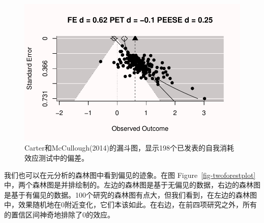 \documentclass[
  letterpaper,
  DIV=11,
  numbers=noendperiod]{scrreprt}
\begin{document}
\begin{figure}

{\centering \includegraphics[width=1\textwidth,height=\textheight]{12-bias_files/figure-pdf/fig-carterbias-1.pdf}

}

\caption{\label{fig-carterbias}Carter和McCullough(2014)的漏斗图，显示198个已发表的自我消耗效应测试中的偏差。}

\end{figure}

我们也可以在元分析的森林图中看到偏见的迹象。在图
Figure~\ref{fig-twoforestplot}
中，两个森林图是并排绘制的。左边的森林图是基于无偏见的数据，右边的森林图是基于有偏见的数据。100个研究的森林图有点大，但我们看到，在左边的森林图中，效果随机地在0附近变化，它们本该如此。在右边，在前四项研究之外，所有的置信区间神奇地排除了0的效应。
\end{document}
